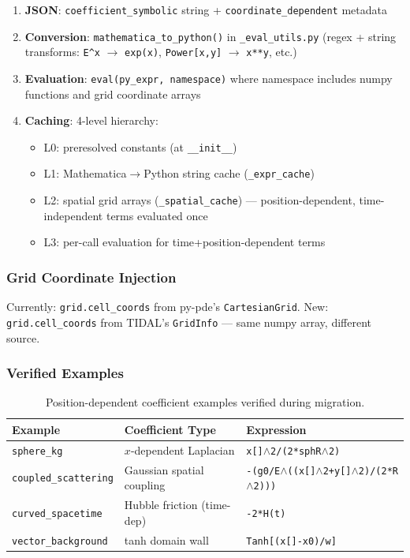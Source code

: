 \begin{enumerate}
  \item \textbf{JSON}: \texttt{coefficient\_symbolic} string + \texttt{coordinate\_dependent} metadata
  \item \textbf{Conversion}: \texttt{mathematica\_to\_python()} in \texttt{\_eval\_utils.py} (regex + string
    transforms: \texttt{E\^{}x} $\to$ \texttt{exp(x)}, \texttt{Power[x,y]} $\to$ \texttt{x**y}, etc.)
  \item \textbf{Evaluation}: \texttt{eval(py\_expr, namespace)} where namespace includes numpy
    functions and grid coordinate arrays
  \item \textbf{Caching}: 4-level hierarchy:
  \begin{itemize}
    \item L0: preresolved constants (at \texttt{\_\_init\_\_})
    \item L1: Mathematica$\to$Python string cache (\texttt{\_expr\_cache})
    \item L2: spatial grid arrays (\texttt{\_spatial\_cache}) --- position-dependent,
      time-independent terms evaluated once
    \item L3: per-call evaluation for time+position-dependent terms
  \end{itemize}
\end{enumerate}

\subsubsection{Grid Coordinate Injection}
\label{sec:grid-coords}

Currently: \texttt{grid.cell\_coords} from py-pde's \texttt{CartesianGrid}.
New: \texttt{grid.cell\_coords} from TIDAL's \texttt{GridInfo} --- same numpy array, different
source.

\subsubsection{Verified Examples}
\label{sec:verified-examples}

\begin{table}[htbp]
\centering
\caption{Position-dependent coefficient examples verified during migration.}
\label{tab:coeff-examples}
\begin{tabular}{@{}lll@{}}
\toprule
Example & Coefficient Type & Expression \\
\midrule
\texttt{sphere\_kg} & $x$-dependent Laplacian & \texttt{x[]$\wedge$2/(2*sphR$\wedge$2)} \\
\texttt{coupled\_scattering} & Gaussian spatial coupling & \texttt{-(g0/E$\wedge$((x[]$\wedge$2+y[]$\wedge$2)/(2*R$\wedge$2)))} \\
\texttt{curved\_spacetime} & Hubble friction (time-dep) & \texttt{-2*H(t)} \\
\texttt{vector\_background} & tanh domain wall & \texttt{Tanh[(x[]-x0)/w]} \\
\bottomrule
\end{tabular}
\end{table}

